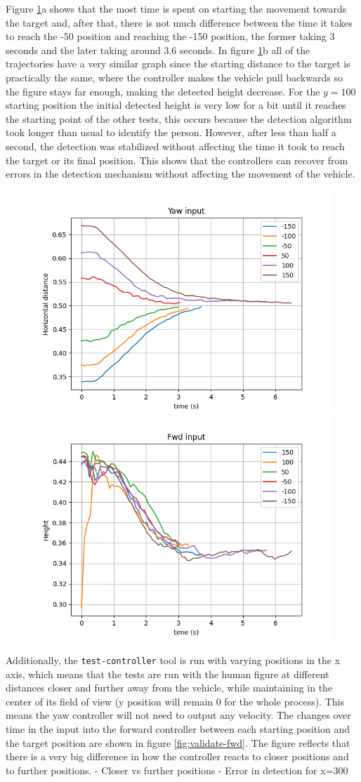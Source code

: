 Figure \ref{fig:validate-yaw}a shows that the most time is spent on starting the movement towards the target and, after that, there is not much difference between the time it takes to reach the -50 position and reaching the -150 position, the former taking 3 seconds and the later taking around 3.6 seconds.
In figure \ref{fig:validate-yaw}b all of the trajectories have a very similar graph since the starting distance to the target is practically the same, where the controller makes the vehicle pull backwards so the figure stays far enough, making the detected height decrease.
For the $y=100$ starting position the initial detected height is very low for a bit until it reaches the starting point of the other tests, this occurs because the detection algorithm took longer than usual to identify the person.
However, after less than half a second, the detection was stabilized without affecting the time it took to reach the target or its final position.
This shows that the controllers can recover from errors in the detection mechanism without affecting the movement of the vehicle.


\begin{figure}
  \centering
  \includegraphics[width=.45\linewidth]{img/pid/validation_yaw.png}
  \includegraphics[width=.45\linewidth]{img/pid/validation_yaw_2.png}
  \caption{}\label{fig:validate-yaw}
\end{figure}

Additionally, the \texttt{test-controller} tool is run with varying positions in the x axis, which means that the tests are run with the human figure at different distances closer and further away from the vehicle, while maintaining in the center of its field of view (y position will remain 0 for the whole process).
This means the yaw controller will not need to output any velocity.
The changes over time in the input into the forward controller between each starting position and the target position are shown in figure \ref{fig:validate-fwd}.
The figure reflects that there is a very big difference in how the controller reacts to closer positions and to further positions.
- Closer vs further positions
- Error in detection for x=300

